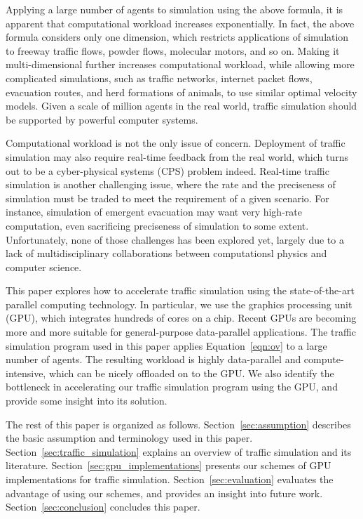 \documentclass[times, 10pt, twocolumn]{article}
\begin{document}
Applying a large number of agents to simulation using the above formula,
it is apparent that computational workload increases exponentially.
In fact, the above formula considers only one dimension, which restricts
applications of simulation to freeway traffic flows, powder flows,
molecular motors, and so on.
Making it multi-dimensional further increases computational workload,
while allowing more complicated simulations, such as traffic networks,
internet packet flows, evacuation routes, and herd formations of
animals, to use similar optimal velocity models.
Given a scale of million agents in the real world, traffic
simulation should be supported by powerful computer systems.

Computational workload is not the only issue of concern.
Deployment of traffic simulation may also require real-time feedback
from the real world, which turns out to be a cyber-physical systems
(CPS) problem indeed.
Real-time traffic simulation is another challenging issue, where
the rate and the preciseness of simulation must be traded to meet the
requirement of a given scenario.
For instance, simulation of emergent evacuation may want very high-rate
computation, even sacrificing preciseness of simulation to some extent.
Unfortunately, none of those challenges has been explored yet, largely
due to a lack of multidisciplinary collaborations between computationsl
physics and computer science.

This paper explores how to accelerate traffic simulation using the
state-of-the-art parallel computing technology.
In particular, we use the graphics processing unit (GPU), which
integrates hundreds of cores on a chip.
Recent GPUs are becoming more and more suitable for general-purpose
data-parallel applications.
The traffic simulation program used in this paper applies
Equation~\eqref{eqn:ov} to a large number of agents.
The resulting workload is highly data-parallel and compute-intensive,
which can be nicely offloaded on to the GPU.
We also identify the bottleneck in accelerating our traffic simulation
program using the GPU, and provide some insight into its solution.

The rest of this paper is organized as follows.
Section~\ref{sec:assumption} describes the basic assumption and
terminology used in this paper.
Section~\ref{sec:traffic_simulation} explains an overview of
traffic simulation and its literature.
Section~\ref{sec:gpu_implementations} presents our schemes of GPU
implementations for traffic simulation.
Section~\ref{sec:evaluation} evaluates the advantage of using our
schemes, and provides an insight into future work.
Section~\ref{sec:conclusion} concludes this paper.
\end{document}
